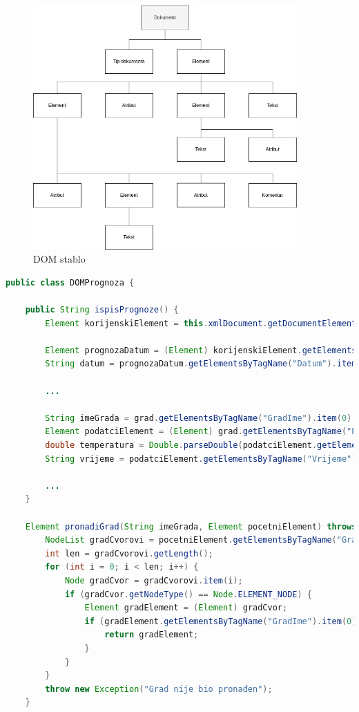 \documentclass[]{foi}
\begin{document}
\begin{figure}[h!]
	\centering
	\includegraphics[width=0.9\textwidth]{slike/DOM_stablo.png}
	\caption{DOM stablo}
\end{figure}

\begin{lstlisting}[language=java, caption={Dohvačanje vrijednosti iz DOM stabla}]
public class DOMPrognoza {

    public String ispisPrognoze() {
        Element korijenskiElement = this.xmlDocument.getDocumentElement();

        Element prognozaDatum = (Element) korijenskiElement.getElementsByTagName("DatumTermin").item(0);
        String datum = prognozaDatum.getElementsByTagName("Datum").item(0).getTextContent();

        ...

        String imeGrada = grad.getElementsByTagName("GradIme").item(0).getTextContent();
        Element podatciElement = (Element) grad.getElementsByTagName("Podatci").item(0);
        double temperatura = Double.parseDouble(podatciElement.getElementsByTagName("Temp").item(0).getTextContent());
        String vrijeme = podatciElement.getElementsByTagName("Vrijeme").item(0).getTextContent();

        ...
    }

    Element pronadiGrad(String imeGrada, Element pocetniElement) throws Exception {
        NodeList gradCvorovi = pocetniElement.getElementsByTagName("Grad");
        int len = gradCvorovi.getLength();
        for (int i = 0; i < len; i++) {
            Node gradCvor = gradCvorovi.item(i);
            if (gradCvor.getNodeType() == Node.ELEMENT_NODE) {
                Element gradElement = (Element) gradCvor;
                if (gradElement.getElementsByTagName("GradIme").item(0).getTextContent().equals(imeGrada)) {
                    return gradElement;
                }
            }
        }
        throw new Exception("Grad nije bio pronađen");
    }
\end{lstlisting}
\end{document}
